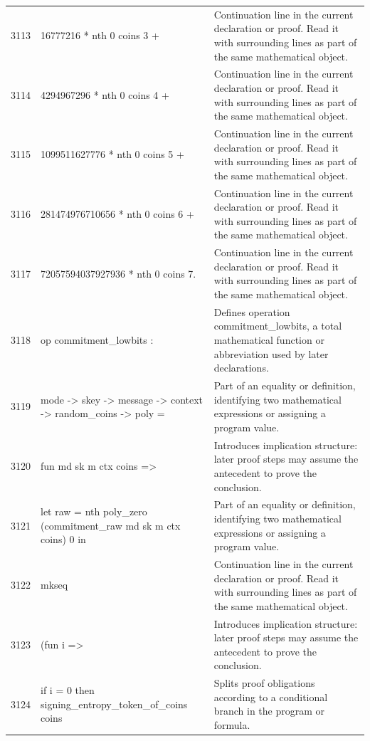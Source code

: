\documentclass[10pt]{article}
\begin{document}
\begin{longtable}{r L{0.53\textwidth} L{0.37\textwidth}}
3113 & {\ttfamily\scriptsize   16777216 * nth 0 coins 3 +} & Continuation line in the current declaration or proof.  Read it with surrounding lines as part of the same mathematical object. \\
3114 & {\ttfamily\scriptsize   4294967296 * nth 0 coins 4 +} & Continuation line in the current declaration or proof.  Read it with surrounding lines as part of the same mathematical object. \\
3115 & {\ttfamily\scriptsize   1099511627776 * nth 0 coins 5 +} & Continuation line in the current declaration or proof.  Read it with surrounding lines as part of the same mathematical object. \\
3116 & {\ttfamily\scriptsize   281474976710656 * nth 0 coins 6 +} & Continuation line in the current declaration or proof.  Read it with surrounding lines as part of the same mathematical object. \\
3117 & {\ttfamily\scriptsize   72057594037927936 * nth 0 coins 7.} & Continuation line in the current declaration or proof.  Read it with surrounding lines as part of the same mathematical object. \\
3118 & {\ttfamily\scriptsize op commitment\_lowbits :} & Defines operation commitment\_lowbits, a total mathematical function or abbreviation used by later declarations. \\
3119 & {\ttfamily\scriptsize   mode -> skey -> message -> context -> random\_coins -> poly =} & Part of an equality or definition, identifying two mathematical expressions or assigning a program value. \\
3120 & {\ttfamily\scriptsize   fun md sk m ctx coins =>} & Introduces implication structure: later proof steps may assume the antecedent to prove the conclusion. \\
3121 & {\ttfamily\scriptsize     let raw = nth poly\_zero (commitment\_raw md sk m ctx coins) 0 in} & Part of an equality or definition, identifying two mathematical expressions or assigning a program value. \\
3122 & {\ttfamily\scriptsize     mkseq} & Continuation line in the current declaration or proof.  Read it with surrounding lines as part of the same mathematical object. \\
3123 & {\ttfamily\scriptsize       (fun i =>} & Introduces implication structure: later proof steps may assume the antecedent to prove the conclusion. \\
3124 & {\ttfamily\scriptsize         if i = 0 then signing\_entropy\_token\_of\_coins coins} & Splits proof obligations according to a conditional branch in the program or formula. \\

\end{longtable}
\end{document}
